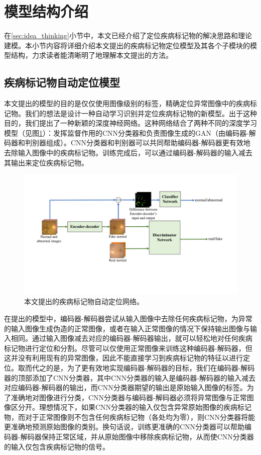 \section{模型结构介绍}\label{sec:model_architecture_intro}
在\ref{sec:idea_thinking}小节中，本文已经介绍了定位疾病标记物的解决思路和理论建模。本小节内容将详细介绍本文提出的疾病标记物定位模型及其各个子模块的模型结构，力求读者能清晰明了地理解本文提出的方法。
\subsection{疾病标记物自动定位模型}\label{subsec:model_architecture}
本文提出的模型的目的是仅仅使用图像级别的标签，精确定位异常图像中的疾病标记物。我们的想法是设计一种自动学习识别并定位疾病标记物的新模型。出于这种目的，我们提出了一种新颖的深度神经网络。这种网络结合了两种不同的深度学习模型（见图\ref{fig:our_model_architecture}）：发挥监督作用的CNN分类器和负责图像生成的GAN（由编码器-解码器和判别器组成）。CNN分类器和判别器可以共同帮助编码器-解码器更有效地去除输入图像中的疾病标记物。训练完成后，可以通过编码器-解码器的输入减去其输出来定位疾病标记物。
\begin{figure}[h]
	\centering
	\includegraphics[width=1.0\textwidth]{figure/method.pdf}
	\caption[本文提出的疾病标记物自动定位网络]{本文提出的疾病标记物自动定位网络。} 
	\label{fig:our_model_architecture}
\end{figure}
在提出的模型中，编码器-解码器尝试从输入图像中去除任何疾病标记物，为异常的输入图像生成伪造的正常图像，或者在输入正常图像的情况下保持输出图像与输入相同。通过输入图像减去对应的编码器-解码器输出，就可以轻松地对任何疾病标记物进行定位和分割。尽管可以仅使用正常图像来训练这种编码器-解码器，但这并没有利用现有的异常图像，因此不能直接学习到疾病标记物的特征以进行定位。取而代之的是，为了更有效地实现编码器-解码器的目标，我们在编码器-解码器的顶部添加了CNN分类器，其中CNN分类器的输入是编码器-解码器的输入减去对应编码器-解码器的输出，而CNN分类器期望的输出是原始输入图像的标签。为了准确地对图像进行分类，CNN分类器与编码器-解码器必须将异常图像与正常图像区分开。理想情况下，如果CNN分类器的输入仅包含异常原始图像的疾病标记物，而对于正常图像则不包含任何疾病标记物（各处均为零），则CNN分类器将能更准确地预测原始图像的类别。换句话说，训练更准确的CNN分类器可以帮助编码器-解码器保持正常区域，并从原始图像中移除疾病标记物，从而使CNN分类器的输入仅包含疾病标记物的信号。

